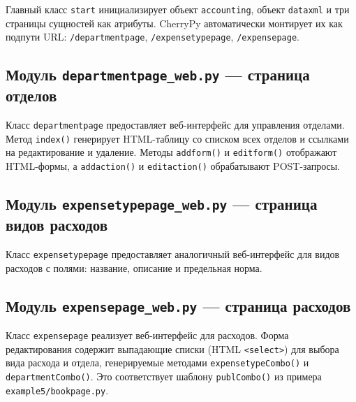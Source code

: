 \documentclass[14pt,a4paper]{extreport}
\begin{document}
Главный класс \texttt{start} инициализирует объект \texttt{accounting}, объект \texttt{dataxml} и три страницы сущностей как атрибуты. CherryPy автоматически монтирует их как подпути URL: \texttt{/departmentpage}, \texttt{/expensetypepage}, \texttt{/expensepage}.



\subsection{Модуль \texttt{departmentpage\_web.py} --- страница отделов}

Класс \texttt{departmentpage} предоставляет веб-интерфейс для управления отделами. Метод \texttt{index()} генерирует HTML-таблицу со списком всех отделов и ссылками на редактирование и удаление. Методы \texttt{addform()} и \texttt{editform()} отображают HTML-формы, а \texttt{addaction()} и \texttt{editaction()} обрабатывают POST-запросы.



\subsection{Модуль \texttt{expensetypepage\_web.py} --- страница видов расходов}

Класс \texttt{expensetypepage} предоставляет аналогичный веб-интерфейс для видов расходов с полями: название, описание и предельная норма.



\subsection{Модуль \texttt{expensepage\_web.py} --- страница расходов}

Класс \texttt{expensepage} реализует веб-интерфейс для расходов. Форма редактирования содержит выпадающие списки (HTML \texttt{<select>}) для выбора вида расхода и отдела, генерируемые методами \texttt{expensetypeCombo()} и \texttt{departmentCombo()}. Это соответствует шаблону \texttt{publCombo()} из примера \texttt{example5/bookpage.py}.
\end{document}
